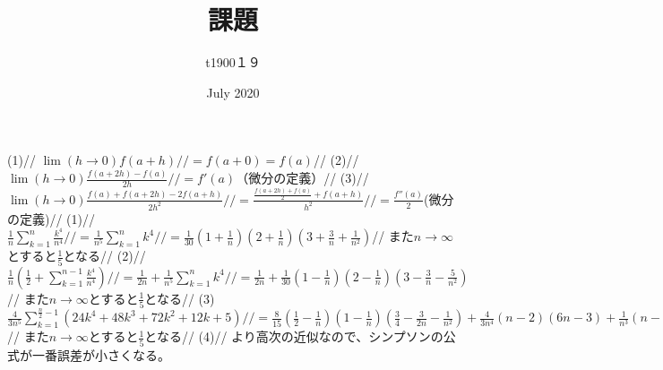 \documentclass{article}
\title{課題}
\author{t1900１９ }
\date{July 2020}
\begin{document}
\maketitle{}
(1)//
$\lim{(h\to0)}f(a+h)//
=f(a+0)=f(a)$//
(2)//
$\lim{(h\to0)}\frac{f(a+2h)-f(a)}{2h}//
=f'(a)$（微分の定義）//
(3)//
$\lim{(h\to0)}\frac{f(a)+f(a+2h)-2f(a+h)}{2h^{2}}//
=\frac{\frac{f(a+2h)+f(a)}{2}+f(a+h)}{h^{2}}//
=\frac{f''(a)}{2}$(微分の定義)//
(1)//
$\frac{1}{n}\sum_{k=1}^{n}{\frac{k^{4}}{n^{4}}}//
=\frac{1}{n^{5}}\sum_{k=1}^{n}{k^{4}//
=\frac{1}{30}(1+\frac{1}{n})(2+\frac{1}{n})(3+\frac{3}{n}+\frac{1}{n^{2}})}$//
また$n\to \infty$とすると$\frac{1}{5}$となる//
(2)//
$\frac{1}{n}(\frac{1}{2}+\sum_{k=1}^{n-1}{\frac{k^{4}}{n^{4}}})//
=\frac{1}{2n}+\frac{1}{n^{5}}\sum_{k=1}^{n}{k^{4}//
=\frac{1}{2n}+\frac{1}{30}(1-\frac{1}{n})(2-\frac{1}{n})(3-\frac{3}{n}-\frac{5}{n^{2}})}$//
また$n\to \infty$とすると$\frac{1}{5}$となる//
(3)\\$\frac{4}{3n^{5}}\sum_{k=1}^{\frac{n}{2}-1}{(24k^{4}+48k^{3}+72k^{2}+12k+5)}//
=\frac{8}{15}(\frac{1}{2}-\frac{1}{n})(1-\frac{1}{n})(\frac{3}{4}-\frac{3}{2n}-\frac{1}{n^{2}})+\frac{4}{3n^{4}}(n-2)(6n-3)+\frac{1}{n^{3}}(n-2)^{2}+\frac{20}{3n^{5}}(\frac{n}{2}-1)$//
また$n\to \infty$とすると$\frac{1}{5}$となる//
(4)//
より高次の近似なので、シンプソンの公式が一番誤差が小さくなる。
\end{document}
